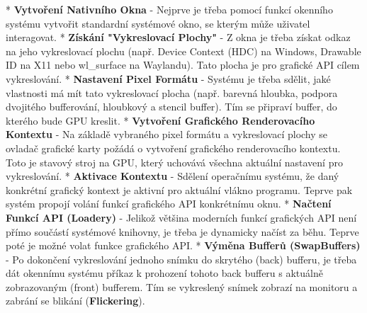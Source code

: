 \begitems
* {\bf Vytvoření Nativního Okna} - Nejprve je třeba pomocí funkcí okenního systému vytvořit standardní systémové okno, se kterým může uživatel interagovat. 
* {\bf Získání "Vykreslovací Plochy"} - Z okna je třeba získat odkaz na jeho vykreslovací plochu (např. Device Context (HDC) na Windows, Drawable ID na X11 nebo wl\_surface na Waylandu). Tato plocha je pro grafické API cílem vykreslování.
* {\bf Nastavení Pixel Formátu} - Systému je třeba sdělit, jaké vlastnosti má mít tato vykreslovací plocha (např. barevná hloubka, podpora dvojitého bufferování, hloubkový a stencil buffer). Tím se připraví buffer, do kterého bude GPU kreslit.
* {\bf Vytvoření Grafického Renderovacího Kontextu} - Na základě vybraného pixel formátu a vykreslovací plochy se ovladač grafické karty požádá o vytvoření grafického renderovacího kontextu. Toto je stavový stroj na GPU, který uchovává všechna aktuální nastavení pro vykreslování.
* {\bf Aktivace Kontextu} - Sdělení operačnímu systému, že daný konkrétní grafický kontext je aktivní pro aktuální vlákno programu. Teprve pak systém propojí volání funkcí grafického API konkrétnímu oknu.
* {\bf Načtení Funkcí API (Loadery)} - Jelikož většina moderních funkcí grafických API není přímo součástí systémové knihovny, je třeba je dynamicky načíst za běhu. Teprve poté je možné volat funkce grafického API.
* {\bf Výměna Bufferů (SwapBuffers)} - Po dokončení vykreslování jednoho snímku do skrytého (back) bufferu, je třeba dát okennímu systému příkaz k prohození tohoto back bufferu s aktuálně zobrazovaným (front) bufferem. Tím se vykreslený snímek zobrazí na monitoru a zabrání se blikání ({\bf Flickering}).
\enditems


